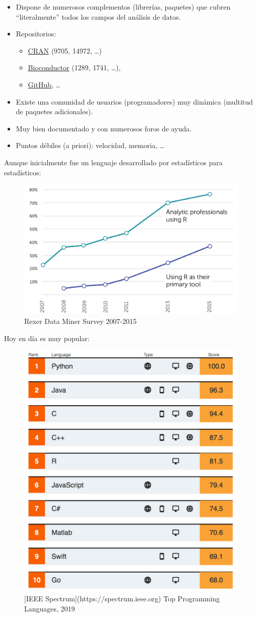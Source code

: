 \documentclass[]{book}
\begin{document}
\begin{itemize}
\item
  Dispone de numerosos complementos (librerías, paquetes) que cubren
  ``literalmente'' todos los campos del análisis de datos.
\item
  Repositorios:

  \begin{itemize}
  \item
    \href{https://cran.r-project.org}{CRAN} (9705, 14972, \ldots{})
  \item
    \href{https://www.bioconductor.org}{Bioconductor} (1289, 1741,
    \ldots{}),
  \item
    \href{https://github.com/trending/r?since=monthly}{GitHub}, \ldots{}
  \end{itemize}
\item
  Existe una comunidad de usuarios (programadores) muy dinámica
  (multitud de paquetes adicionales).
\item
  Muy bien documentado y con numerosos foros de ayuda.
\item
  Puntos débiles (a priori): velocidad, memoria, \ldots{}
\end{itemize}

Aunque inicialmente fue un lenguaje desarrollado por estadísticos para
estadísticos:

\begin{figure}[!htb]

{\centering \includegraphics[width=0.4\linewidth]{figuras/rexer2016} 

}

\caption{Rexer Data Miner Survey 2007-2015}\label{fig:rexer}
\end{figure}

Hoy en día es muy popular:

\begin{figure}[!htb]

{\centering \includegraphics[width=0.35\linewidth]{figuras/IEEE-top-programming-languages-of-2019} 

}

\caption{[IEEE Spectrum](https://spectrum.ieee.org) Top Programming Languages, 2019}\label{fig:ieee}
\end{figure}
\end{document}
